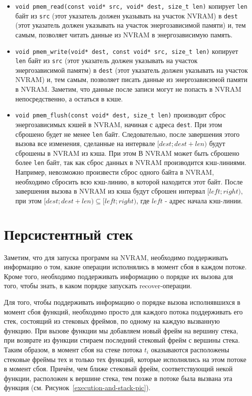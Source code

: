 \documentclass[times,specification,annotation]{itmo-student-thesis}
\begin{document}
\begin{itemize}
    \item \texttt{void pmem\_read(const void* src, void* dest, size\_t len)} копирует \texttt{len} байт из \texttt{src} (этот указатель должен указывать на участок NVRAM) в \texttt{dest} (этот указатель должен указывать на участок энергозависимой памяти) и, тем самым, позволяет читать данные из NVRAM в энергозависимую память.
    
    \item \texttt{void pmem\_write(void* dest, const void* src, size\_t len)} копирует \texttt{len} байт из \texttt{src} (этот указатель должен указывать на участок энергозависимой памятм) в \texttt{dest} (этот указатель должен указывать на участок NVRAM) и, тем самым, позволяет писать данные из энергозависимой памяти в NVRAM. Заметим, что данные после записи могут не попасть в NVRAM непосредственно, а остаться в кэше.
    
    \item \texttt{void pmem\_flush(const void* dest, size\_t len)} производит сброс энергозависимых кэшей в NVRAM, начиная с адреса \texttt{dest}. При этом сброшено будет не менее \texttt{len} байт. Следовательно, после завершения этого вызова все изменения, сделанные на интервале $[dest; dest + len)$ будут сброшены в NVRAM из кэша. При этом В NVRAM может быть сброшено более \texttt{len} байт, так как сброс данных в NVRAM производится кэш-линиями.  Например, невозможно произвести сброс одного байта в NVRAM, необходимо сбросить всю кэш-линию, в которой находится этот байт. После завершения вызова в NVRAM из кэша будут сброшен интервал $[left; right)$, при этом $[dest; dest + len) \subseteq [left; right)$, где $left$ - адрес начала кэш-линии. 
    
\end{itemize}

\section{Персистентный стек}
\label{persistent-stack}

Заметим, что для запуска программ на NVRAM, необходимо поддерживать информацию о том, какие операции исполнялись в момент сбоя в каждом потоке. Кроме того, необходимо поддерживать информацию о порядке их вызова для того, чтобы знать, в каком порядке запускать recover-операции.

Для того, чтобы поддерживать информацию о порядке вызова исполнявшихся в момент сбоя функций, необходимо просто для каждого потока поддерживать его стек, состоящий из стековых фреймов, по одному на каждую вызванную функцию. При вызове функции мы добавляем новый фрейм на вершину стека, при возврате из функции стираем последний стековый фрейм с вершины стека. Таким образом, в момент сбоя на стеке потока $t_i$ оказываются расположены стековые фреймы тех и только тех функций, которые исполнялись на этом потоке в момент сбоя. Причём, чем ближе стековый фрейм, соответствующий некой функции, расположен к вершине стека, тем позже в потоке была вызвана эта функция (см. Рисунок~\ref{execution-and-stack-pic}).
\end{document}
